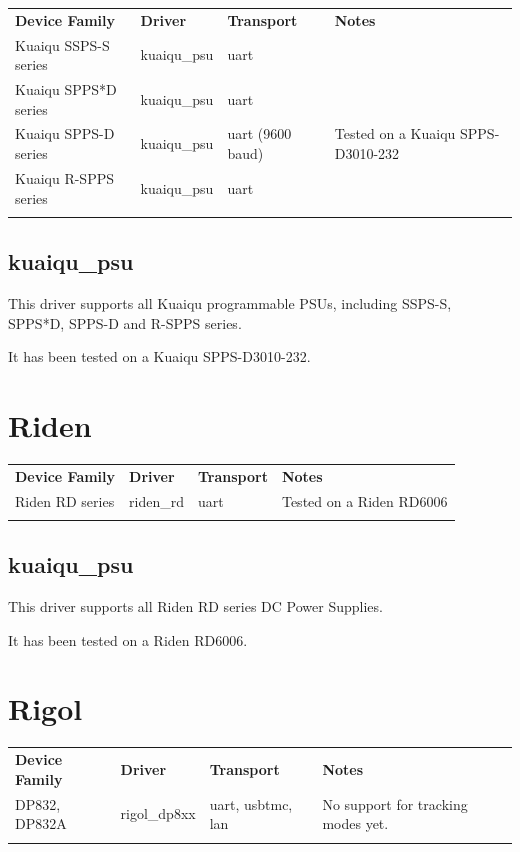 \begin{tabularx}{16cm}{lllX}
\thickhline
\textbf{Device Family} & \textbf{Driver} & \textbf{Transport} & \textbf{Notes} \\
\thickhline
Kuaiqu SSPS-S series & kuaiqu\_psu & uart & \\
Kuaiqu SPPS*D series & kuaiqu\_psu & uart & \\
Kuaiqu SPPS-D series & kuaiqu\_psu & uart (9600 baud) & Tested on a Kuaiqu SPPS-D3010-232\\
Kuaiqu R-SPPS series & kuaiqu\_psu & uart & \\
\thickhline
\end{tabularx}

\subsection{kuaiqu\_psu}

This driver supports all Kuaiqu programmable PSUs, including SSPS-S, SPPS*D, SPPS-D and R-SPPS series.

It has been tested on a Kuaiqu SPPS-D3010-232.

\section{Riden}

\begin{tabularx}{16cm}{lllX}
\thickhline
\textbf{Device Family} & \textbf{Driver} & \textbf{Transport} & \textbf{Notes} \\
\thickhline
Riden RD series & riden\_rd & uart & Tested on a Riden RD6006\\
\thickhline
\end{tabularx}

\subsection{kuaiqu\_psu}

This driver supports all Riden RD series DC Power Supplies.

It has been tested on a Riden RD6006.

\section{Rigol}

\begin{tabularx}{16cm}{lllX}
\thickhline
\textbf{Device Family} & \textbf{Driver} & \textbf{Transport} & \textbf{Notes} \\
\thickhline
DP832, DP832A & rigol\_dp8xx & uart, usbtmc, lan & No support for tracking modes yet.\\
\thickhline
\end{tabularx}

